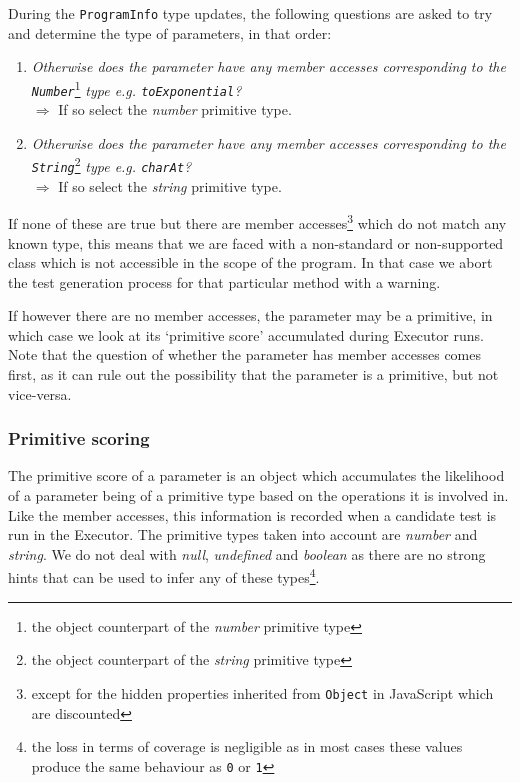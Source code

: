 During the \texttt{ProgramInfo} type updates, the following questions are asked to try and determine the type of parameters, in that order:

\begin{enumerate}
   \begin{item}
      \emph{Does the parameter have any user-defined member accesses?}\\\(\Rightarrow\) If so select the highest match.
   \end{item}
   \item \emph{Otherwise does the parameter have any member accesses corresponding to the \texttt{\emph{Number}}}\footnote{the object counterpart of the \emph{number} primitive type} \emph{type \emph{e.g.} \texttt{\emph{toExponential}}?}\\\(\Rightarrow\) If so select the \emph{number} primitive type.
   \item \emph{Otherwise does the parameter have any member accesses corresponding to the \texttt{\emph{String}}}\footnote{the object counterpart of the \emph{string} primitive type} \emph{type \emph{e.g.} \texttt{\emph{charAt}}?}\\\(\Rightarrow\) If so select the \emph{string} primitive type.
\end{enumerate}

If none of these are true but there are member accesses\footnote{except for the hidden properties inherited from \texttt{Object} in JavaScript which are discounted} which do not match any known type, this means that we are faced with a non-standard or non-supported class which is not accessible in the scope of the program. In that case we abort the test generation process for that particular method with a warning.

If however there are no member accesses, the parameter may be a primitive, in which case we look at its `primitive score' accumulated during \textsf{Executor} runs. Note that the question of whether the parameter has member accesses comes first, as it can rule out the possibility that the parameter is a primitive, but not vice-versa.

\subsubsection{Primitive scoring}
The primitive score of a parameter is an object which accumulates the likelihood of a parameter being of a primitive type based on the operations it is involved in. Like the member accesses, this information is recorded when a candidate test is run in the \textsf{Executor}. The primitive types taken into account are \emph{number} and \emph{string}. We do not deal with \emph{null}, \emph{undefined} and \emph{boolean} as there are no strong hints that can be used to infer any of these types\footnote{the loss in terms of coverage is negligible as in most cases these values produce the same behaviour as \texttt{0} or \texttt{1}}.

